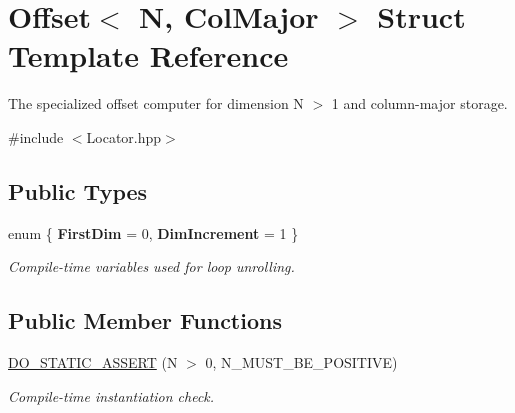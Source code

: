 \hypertarget{struct_d_o_1_1_offset_3_01_n_00_01_col_major_01_4}{\section{Offset$<$ N, Col\-Major $>$ Struct Template Reference}
\label{struct_d_o_1_1_offset_3_01_n_00_01_col_major_01_4}
}


The specialized offset computer for dimension N $>$ 1 and column-\/major storage.  




{\ttfamily \#include $<$Locator.\-hpp$>$}

\subsection*{Public Types}
\begin{DoxyCompactItemize}
\item 
enum \{ {\bfseries First\-Dim} = 0, 
{\bfseries Dim\-Increment} = 1
 \}
\begin{DoxyCompactList}\small\item\em Compile-\/time variables used for loop unrolling. \end{DoxyCompactList}\end{DoxyCompactItemize}
\subsection*{Public Member Functions}
\begin{DoxyCompactItemize}
\item 
\hypertarget{struct_d_o_1_1_offset_3_01_n_00_01_col_major_01_4_a2b745a93d3b7a3bf968d6839047f5774}{\hyperlink{struct_d_o_1_1_offset_3_01_n_00_01_col_major_01_4_a2b745a93d3b7a3bf968d6839047f5774}{D\-O\-\_\-\-S\-T\-A\-T\-I\-C\-\_\-\-A\-S\-S\-E\-R\-T} (N $>$ 0, N\-\_\-\-M\-U\-S\-T\-\_\-\-B\-E\-\_\-\-P\-O\-S\-I\-T\-I\-V\-E)}\label{struct_d_o_1_1_offset_3_01_n_00_01_col_major_01_4_a2b745a93d3b7a3bf968d6839047f5774}

\begin{DoxyCompactList}\small\item\em Compile-\/time instantiation check. \end{DoxyCompactList}\end{DoxyCompactItemize}
